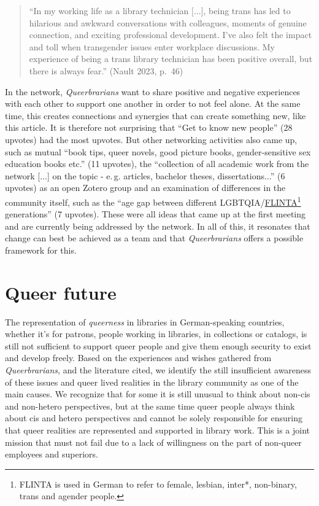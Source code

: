 \documentclass[a4paper,
fontsize=11pt,
oneside,
numbers=noperiodatend,
parskip=half-,
bibliography=totoc,
final
]{scrartcl}
\begin{document}
\begin{quote}
\enquote{In my working life as a library technician {[}...{]}, being trans has
led to hilarious and awkward conversations with colleagues, moments of
genuine connection, and exciting professional development.
I've also felt the impact and toll when transgender
issues enter workplace discussions. My experience of being a trans
library technician has been positive overall, but there is always fear.}
(Nault 2023, p.~46)
\end{quote}

In the network, \emph{Queerbrarians} want to share positive and negative
experiences with each other to support one another in order to not feel
alone. At the same time, this creates connections and synergies that can
create something new, like this article. It is therefore not surprising
that \enquote{Get to know new people} (28 upvotes) had the most upvotes. But
other networking activities also came up, such as mutual \enquote{book tips,
queer novels, good picture books, gender-sensitive sex education books
etc.} (11 upvotes), the \enquote{collection of all academic work from the
network {[}...{]} on the topic - e.\,g. articles, bachelor theses,
dissertations...} (6 upvotes) as an open Zotero group and an examination
of differences in the community itself, such as the \enquote{age gap between
different
LGBTQIA/\href{https://en.wikipedia.org/wiki/FLINTA*}{FLINTA}\footnote{FLINTA
  is used in German to refer to female, lesbian, inter*, non-binary,
  trans and agender people.} generations} (7 upvotes). These were all
ideas that came up at the first meeting and are currently being
addressed by the network. In all of this, it resonates that change can
best be achieved as a team and that \emph{Queerbrarians} offers a
possible framework for this.

\hypertarget{queer-future}{%
\section{Queer future}\label{queer-future}}

The representation of \emph{queerness} in libraries in German-speaking
countries, whether it's for patrons, people working in libraries, in
collections or catalogs, is still not sufficient to support queer people
and give them enough security to exist and develop freely. Based on the
experiences and wishes gathered from \emph{Queerbrarians}, and the
literature cited, we identify the still insufficient awareness of these
issues and queer lived realities in the library community as one of the
main causes. We recognize that for some it is still unusual to think
about non-cis and non-hetero perspectives, but at the same time queer
people always think about cis and hetero perspectives and cannot be
solely responsible for ensuring that queer realities are represented and
supported in library work. This is a joint mission that must not fail
due to a lack of willingness on the part of non-queer employees and
superiors.
\end{document}
